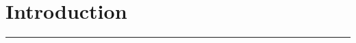 \chapter{Introduction}\label{chp:intro}
\vspace{-1.5cm}
\noindent\rule{\columnwidth}{1.2mm}
\vspace{0.1cm}

